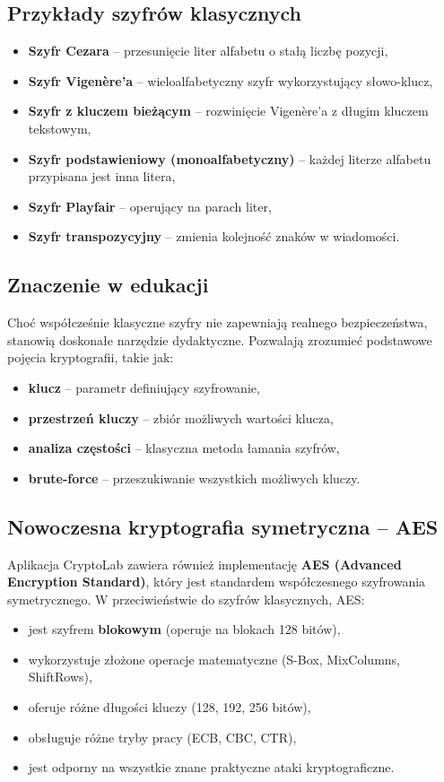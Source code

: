 \documentclass[12pt,a4paper]{article}
\begin{document}
\subsection{Przykłady szyfrów klasycznych}
\begin{itemize}
    \item \textbf{Szyfr Cezara} -- przesunięcie liter alfabetu o stałą liczbę pozycji,
    \item \textbf{Szyfr Vigenère'a} -- wieloalfabetyczny szyfr wykorzystujący słowo-klucz,
    \item \textbf{Szyfr z kluczem bieżącym} -- rozwinięcie Vigenère'a z długim kluczem tekstowym,
    \item \textbf{Szyfr podstawieniowy (monoalfabetyczny)} -- każdej literze alfabetu przypisana jest inna litera,
    \item \textbf{Szyfr Playfair} -- operujący na parach liter,
    \item \textbf{Szyfr transpozycyjny} -- zmienia kolejność znaków w wiadomości.
\end{itemize}

\subsection{Znaczenie w edukacji}
Choć współcześnie klasyczne szyfry nie zapewniają realnego bezpieczeństwa, 
stanowią doskonałe narzędzie dydaktyczne. 
Pozwalają zrozumieć podstawowe pojęcia kryptografii, takie jak:
\begin{itemize}
    \item \textbf{klucz} -- parametr definiujący szyfrowanie,
    \item \textbf{przestrzeń kluczy} -- zbiór możliwych wartości klucza,
    \item \textbf{analiza częstości} -- klasyczna metoda łamania szyfrów,
    \item \textbf{brute-force} -- przeszukiwanie wszystkich możliwych kluczy.
\end{itemize}

\subsection{Nowoczesna kryptografia symetryczna -- AES}
Aplikacja CryptoLab zawiera również implementację \textbf{AES (Advanced Encryption Standard)}, 
który jest standardem współczesnego szyfrowania symetrycznego. 
W przeciwieństwie do szyfrów klasycznych, AES:
\begin{itemize}
    \item jest szyfrem \textbf{blokowym} (operuje na blokach 128 bitów),
    \item wykorzystuje złożone operacje matematyczne (S-Box, MixColumns, ShiftRows),
    \item oferuje różne długości kluczy (128, 192, 256 bitów),
    \item obsługuje różne tryby pracy (ECB, CBC, CTR),
    \item jest odporny na wszystkie znane praktyczne ataki kryptograficzne.
\end{itemize}
\end{document}
